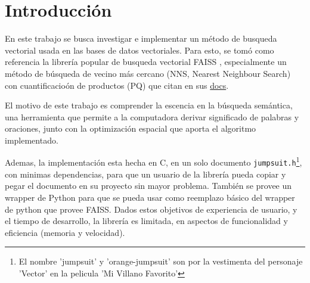 \section{Introducci\'on}

En este trabajo se busca investigar e implementar un m\'etodo de busqueda
vectorial usada en las bases de datos vectoriales. 
Para esto, se tom\'o como referencia la librer\'ia popular de busqueda vectorial 
FAISS \cite{faiss_gh}, especialmente un m\'etodo de b\'usqueda 
de vecino m\'as cercano (NNS, Nearest Neighbour Search) con cuantificacio\'on
de productos (PQ) \cite{pqnns} que citan en sus
\href{https://faiss.ai/index.html}{docs}.

El motivo de este trabajo es comprender la escencia en la b\'usqueda 
sem\'antica, una herramienta que permite a la computadora derivar significado
de palabras y oraciones, junto con la optimizaci\'on espacial que aporta el 
algoritmo implementado.

Ademas, la implementaci\'on esta hecha en C, en un solo documento
\verb|jumpsuit.h|\footnote{El nombre 'jumpsuit' y 'orange-jumpsuit' son por la
vestimenta del personaje 'Vector' en la pelicula 'Mi Villano Favorito'},
con minimas dependencias, para que un usuario de la librer\'ia pueda copiar 
y pegar el documento en su proyecto sin mayor problema. 
Tambi\'en se provee un wrapper de Python para que se pueda usar como reemplazo 
b\'asico del wrapper de python que provee FAISS. 
Dados estos objetivos de experiencia de usuario, y el tiempo de desarrollo, 
la librer\'ia es limitada, en aspectos de funcionalidad y eficiencia (memoria y 
velocidad).


